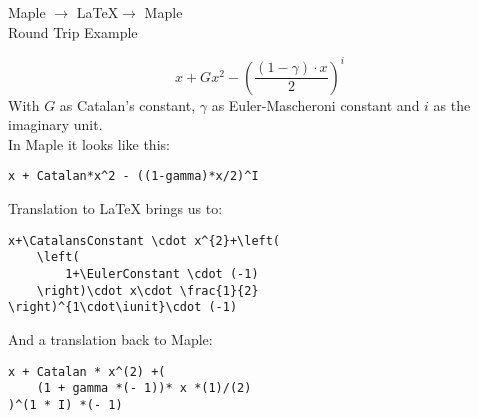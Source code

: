 \documentclass{article}
\begin{document}
\begin{center}
    \Large
    Maple $\rightarrow$ \LaTeX $\rightarrow$ Maple\\[12pt]
    \large Round Trip Example
\end{center}

\begin{equation}\label{eq:jacP}
    x + \mathit{G} x^2 - \left( \frac{(1 - \gamma) \cdot x}{2}  \right)^i
\end{equation}
With $\mathit{G}$ as Catalan's constant, $\gamma$ as Euler-Mascheroni constant and $i$ as the imaginary unit.\\

In Maple it looks like this:
\begin{lstlisting}[mathescape]
x + Catalan*x^2 - ((1-gamma)*x/2)^I
\end{lstlisting}

Translation to LaTeX brings us to:
\begin{lstlisting}[mathescape]
x+\CatalansConstant \cdot x^{2}+\left(
    \left(
        1+\EulerConstant \cdot (-1)
    \right)\cdot x\cdot \frac{1}{2}
\right)^{1\cdot\iunit}\cdot (-1)
\end{lstlisting}

And a translation back to Maple:
\begin{lstlisting}[mathescape]
x + Catalan * x^(2) +(
    (1 + gamma *(- 1))* x *(1)/(2)
)^(1 * I) *(- 1)
\end{lstlisting}
\end{document}
